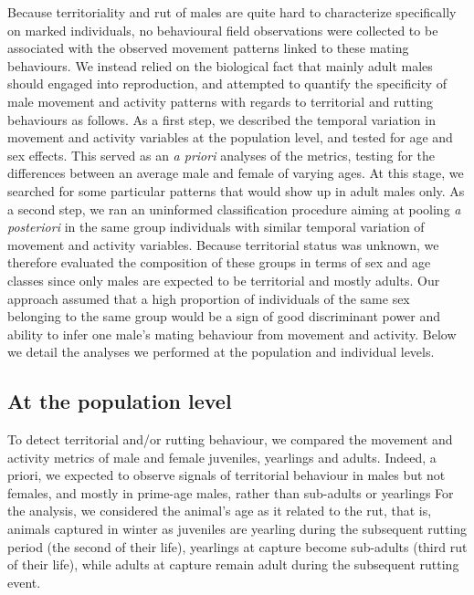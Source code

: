 \documentclass[a4paper,11pt]{article}
\begin{document}
Because territoriality and rut of males are quite hard to characterize
specifically on marked individuals, no behavioural field observations
were collected to be associated with the observed movement patterns
linked to these mating behaviours. We instead relied on the biological
fact that mainly adult males should engaged into reproduction, and
attempted to quantify the specificity of male movement and activity
patterns with regards to territorial and rutting behaviours as
follows. As a first step, we described the temporal variation in
movement and activity variables at the population level, and tested
for age and sex effects. This served as an \textit{a priori} analyses
of the metrics, testing for the differences between an average male
and female of varying ages. At this stage, we searched for some
particular patterns that would show up in adult males only. As a
second step, we ran an uninformed classification procedure aiming at
pooling \textit{a posteriori} in the same group individuals with
similar temporal variation of movement and activity variables. Because
territorial status was unknown, we therefore evaluated the composition
of these groups in terms of sex and age classes since only males are
expected to be territorial and mostly adults. Our approach assumed
that a high proportion of individuals of the same sex belonging to the
same group would be a sign of good discriminant power and ability to
infer one male's mating behaviour from movement and activity. Below we
detail the analyses we performed at the population and individual
levels.

\subsection*{At the population level}
To detect territorial and/or rutting behaviour, we compared the
movement and activity metrics of male and female juveniles, yearlings
and adults. Indeed, a priori, we expected to observe signals of
territorial behaviour in males but not females, and mostly in
prime-age males, rather than sub-adults or yearlings For the analysis,
we considered the animal’s age as it related to the rut, that is,
animals captured in winter as juveniles are yearling during the
subsequent rutting period (the second of their life), yearlings at
capture become sub-adults (third rut of their life), while adults at
capture remain adult during the subsequent rutting event.
\end{document}
